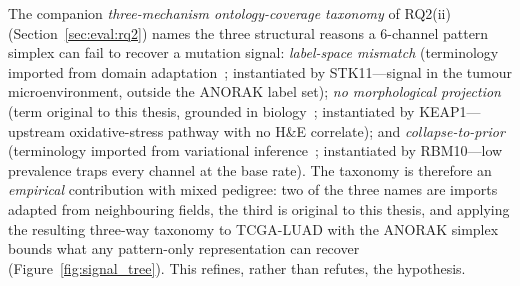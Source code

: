 The companion \emph{three-mechanism ontology-coverage taxonomy}
of RQ2(ii) (Section~\ref{sec:eval:rq2}) names the three
structural reasons a 6-channel pattern simplex can fail to
recover a mutation signal:
\emph{label-space mismatch} (terminology imported from domain
adaptation~\cite{lipton2018labelshift}; instantiated by
STK11---signal in the tumour microenvironment, outside the
ANORAK label set);
\emph{no morphological projection} (term original to this
thesis, grounded in biology~\cite{li2011keap1papillary};
instantiated by KEAP1---upstream oxidative-stress pathway
with no H\&E correlate); and
\emph{collapse-to-prior} (terminology imported from
variational inference~\cite{bowman2016posteriorcollapse};
instantiated by RBM10---low prevalence traps every channel at
the base rate).
The taxonomy is therefore an \emph{empirical} contribution
with mixed pedigree: two of the three names are imports
adapted from neighbouring fields, the third is original to
this thesis, and applying the resulting three-way taxonomy to
TCGA-LUAD with the ANORAK simplex bounds what any pattern-only
representation can recover
(Figure~\ref{fig:signal_tree}).
This refines, rather than refutes, the hypothesis.

